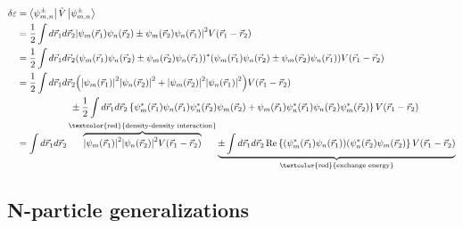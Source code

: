 \documentclass[10pt]{article}
\newcommand{\smallspace}{\hspace{2cm}}
\begin{document}
\begin{align*}
    \delta \varepsilon &= \bra{\psi_{m,n}^\pm}\hat V \ket{\psi_{m,n}^\pm}\\
                       &= \frac{1}{2} \int d\vec r_1 d\vec r_2 \qty|\psi_m(\vec r_1)\psi_n(\vec r_2) \pm \psi_m(\vec r_2)\psi_n(\vec r_1)|^2V(\vec r_1- \vec r_2)\\
                                                    &= \frac{1}{2}\int d\vec r_1 d\vec r_2(\psi_m(\vec r_1)\psi_n(\vec r_2) \pm \psi_m(\vec r_2)\psi_n(\vec r_1))^\ast (\psi_m(\vec r_1)\psi_n(\vec r_2) \pm \psi_m(\vec r_2)\psi_n(\vec r_1))V(\vec r_1 - \vec r_2) \\
                                                    &= \frac{1}{2}\int d\vec r_1 d\vec r_2 \qty(\qty|\psi_m(\vec r_1)|^2 \qty|\psi_n(\vec r_2)|^2+\qty|\psi_m(\vec r_2)|^2\qty|\psi_n(\vec r_1)|^2)V(\vec r_1 - \vec r_2) \\
                &\smallspace\pm \frac{1}{2}\int d\vec r_1 d\vec r_2\left\{\psi_m^\ast(\vec r_1)\psi_n(\vec r_1) \psi_n^\ast(\vec r_2)\psi_m(\vec r_2) + \psi_m(\vec r_1)\psi_n^\ast(\vec r_1)\psi_n(\vec r_2) \psi_m^\ast (\vec r_2)\right\}V(\vec r_1 - \vec r_2)\\
                &= \int d\vec r_1 d\vec r_2 \overbrace{\qty|\psi_m(\vec r_1)|^2 \qty|\psi_n(\vec r_2)|^2 V(\vec r_1 - \vec r_2)}^{\text{\textcolor{red}{density-density interaction}}} \underbrace{\pm \int d\vec r_1 d\vec r_2 \Re\left\{(\psi_m^\ast(\vec r_1)\psi_n(\vec r_1))(\psi^\ast_n(\vec r_2)\psi_m(\vec r_2)\right\}V(\vec r_1 - \vec r_2)}_{\text{\textcolor{red}{exchange energy}}}
\end{align*}

\subsection{N-particle generalizations}
\end{document}
